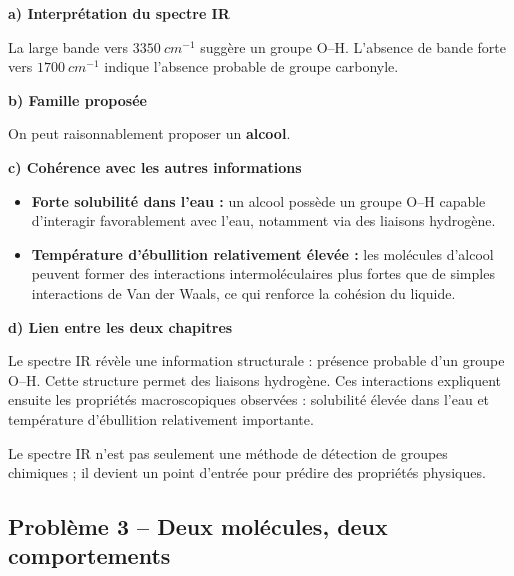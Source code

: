 \documentclass[11pt,a4paper]{article}
\begin{document}
\begin{corrigebox}
\textbf{a) Interprétation du spectre IR}

La large bande vers \(3350\ \si{cm^{-1}}\) suggère un groupe O--H.  
L'absence de bande forte vers \(1700\ \si{cm^{-1}}\) indique l'absence probable de groupe carbonyle.

\textbf{b) Famille proposée}

On peut raisonnablement proposer un \textbf{alcool}.

\textbf{c) Cohérence avec les autres informations}

\begin{itemize}
    \item \textbf{Forte solubilité dans l'eau :} un alcool possède un groupe O--H capable d'interagir favorablement avec l'eau, notamment via des liaisons hydrogène.
    \item \textbf{Température d'ébullition relativement élevée :} les molécules d'alcool peuvent former des interactions intermoléculaires plus fortes que de simples interactions de Van der Waals, ce qui renforce la cohésion du liquide.
\end{itemize}

\textbf{d) Lien entre les deux chapitres}

Le spectre IR révèle une information structurale : présence probable d'un groupe O--H.  
Cette structure permet des liaisons hydrogène.  
Ces interactions expliquent ensuite les propriétés macroscopiques observées : solubilité élevée dans l'eau et température d'ébullition relativement importante.

\begin{ideebox}
Le spectre IR n'est pas seulement une méthode de détection de groupes chimiques ; il devient un point d'entrée pour prédire des propriétés physiques.
\end{ideebox}
\end{corrigebox}

\subsection{Problème 3 -- Deux molécules, deux comportements}
\end{document}
